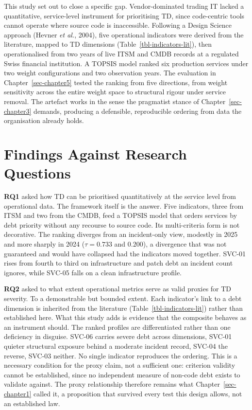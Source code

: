 \documentclass[
  12pt,
  letterpaper,
  12pt,
  oneside,
  english,
  onehalfspacing,
  headsepline]{MastersDoctoralThesis}
\begin{document}
This study set out to close a specific gap. Vendor-dominated trading IT
lacked a quantitative, service-level instrument for prioritising TD,
since code-centric tools cannot operate where source code is
inaccessible. Following a Design Science approach (Hevner \emph{et al.},
2004), five operational indicators were derived from the literature,
mapped to TD dimensions (Table~\ref{tbl-indicators-lit}), then
operationalised from two years of live ITSM and CMDB records at a
regulated Swiss financial institution. A TOPSIS model ranked six
production services under two weight configurations and two observation
years. The evaluation in Chapter~\ref{sec-chapter5} tested the ranking
from five directions, from weight sensitivity across the entire weight
space to structural rigour under service removal. The artefact works in
the sense the pragmatist stance of Chapter~\ref{sec-chapter3} demands,
producing a defensible, reproducible ordering from data the organisation
already holds.

\section{Findings Against Research
Questions}\label{findings-against-research-questions}

\textbf{RQ1} asked how TD can be prioritised quantitatively at the
service level from operational data. The framework itself is the answer.
Five indicators, three from ITSM and two from the CMDB, feed a TOPSIS
model that orders services by debt priority without any recourse to
source code. Its multi-criteria form is not decorative. The ranking
diverges from an incident-only view, modestly in 2025 and more sharply
in 2024 (\(\tau = 0.733\) and \(0.200\)), a divergence that was not
guaranteed and would have collapsed had the indicators moved together.
SVC-01 rises from fourth to third on infrastructure and patch debt an
incident count ignores, while SVC-05 falls on a clean infrastructure
profile.

\textbf{RQ2} asked to what extent operational metrics serve as valid
proxies for TD severity. To a demonstrable but bounded extent. Each
indicator's link to a debt dimension is inherited from the literature
(Table~\ref{tbl-indicators-lit}) rather than established here. What this
study adds is evidence that the composite behaves as an instrument
should. The ranked profiles are differentiated rather than one
deficiency in disguise. SVC-06 carries severe debt across dimensions,
SVC-01 quieter structural exposure behind a moderate incident record,
SVC-04 the reverse, SVC-03 neither. No single indicator reproduces the
ordering. This is a necessary condition for the proxy claim, not a
sufficient one: criterion validity cannot be established, since no
independent measure of non-code debt exists to validate against. The
proxy relationship therefore remains what Chapter~\ref{sec-chapter1}
called it, a proposition that survived every test this design allows,
not an established law.
\end{document}
